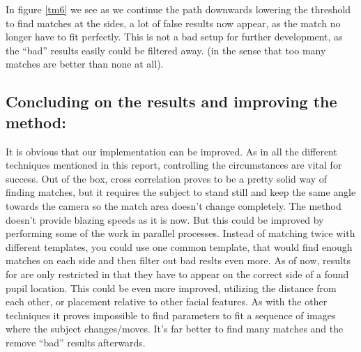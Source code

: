 In figure \ref{tm6} we see as we continue the path downwards lowering
the threshold to find matches at the sides, a lot of false results now
appear, as the match no longer have to fit perfectly. This is not a bad
setup for further development, as the ``bad'' results easily could be
filtered away. (in the sense that too many matches are better than none
at all).

\subsection{Concluding on the results and improving the method:}

It is obvious that our implementation can be improved. As in all the
different techniques mentioned in this report, controlling the
circumstances are vital for success. Out of the box, cross correlation
proves to be a pretty solid way of finding matches, but it requires the
subject to stand still and keep the same angle towards the camera so the
match area doesn't change completely. The method doesn't provide blazing
speeds as it is now. But this could be improved by performing some of
the work in parallel processes. Instead of matching twice with different
templates, you could use one common template, that would find enough
matches on each side and then filter out bad reslts even more. As of
now, results for are only restricted in that they have to appear on the
correct side of a found pupil location. This could be even more
improved, utilizing the distance from each other, or placement relative
to other facial features. As with the other techniques it proves
impossible to find parameters to fit a sequence of images where the
subject changes/moves. It's far better to find many matches and the
remove ``bad'' results afterwards.
